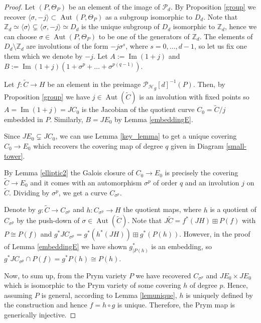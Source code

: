 \documentclass[10pt,a4paper]{amsart}
\DeclareMathOperator{\Aut}{Aut}
\DeclareMathOperator{\Image}{Im}
\newcommand{\ra}{\rightarrow}
\newcommand{\tC}{{\widetilde C}}
\begin{document}
\begin{proof}
	Let $(P,\Theta_P)$ be an element of the image of $\mathcal{P}_{d}$. By Proposition \ref{group} we recover $\langle \sigma, -j  \rangle \subset \Aut(P,\Theta_P)$ as a subgroup isomorphic to $D_{d}$. 
    Note that $\mathbb{Z}_{d} \simeq \langle \sigma \rangle \subsetneq \langle \sigma, -j \rangle \simeq D_{d}$ is the unique subgroup of $D_{d}$ isomorphic to $\mathbb{Z}_{d}$, hence we can choose $\sigma \in \Aut(P,\Theta_P)$ to be one of the generators of $\mathbb{Z}_{d}$. 
    The elements of $D_{d} \setminus \mathbb{Z}_{d}$ are involutions of the form $-j\sigma^s$, where $s = 0,\ldots, d-1$, so let us fix one them which we denote by $-j$. Let $A := \Image(1+j)$ and  $B := \Image(1+j)(1+\sigma^p+\ldots+\sigma^{p(q-1)})$. 
    
Let $f:\tC\to H$ be an element in the preimage $\mathcal{P_H}_g[d]^{-1}(P)$. Then, by Proposition \ref{group} we have $j\in \Aut(\tC)$ is an involution with fixed points so $A=\Image (1+j)=JC_0$ is the Jacobian of the quotient curve $C_0=\tC/j$ embedded in $P$. Similarly, $B=JE_0$ by Lemma \ref{embeddingE}.


   Since $JE_0 \subsetneq JC_0$, we can use Lemma \ref{key_lemma} to get a unique covering $C_0 \ra E_0$ which recovers the covering map of degree $q$ given in Diagram \eqref{small-tower}.

    By Lemma \ref{elliptic2} the Galois closure of $C_0 \to E_0$ is precisely the covering $\tC \to E_0$ and it comes  with an automorphism $\sigma^p$ of order $q$ and an involution $j$ on $\tC$. Dividing by $\sigma^p$, we get a curve $C_{\sigma^p}$. 
    
       Denote by $g:\tC\to C_{\sigma^p}$ and $h:C_{\sigma^p}\to H$ the quotient maps, where $h$ is a quotient of $C_{\sigma^p}$ by the push-down of $\sigma\in\Aut(\tC)$. Note that $J\tC=f^*(JH)\boxplus 
       P(f)$ with $P\cong P(f)$ and $g^*JC_{\sigma^p}=g^*(h^*(JH))\boxplus g^*(P(h))$. However, in the proof of Lemma \ref{embeddingE} we have shown $g^*_{|P(h)}$ is an embedding, so $g^*JC_{\sigma^p}\cap P(f)=g^*P(h)\cong P(h)$. 

    Now, to sum up, from the Prym variety $P$ we have recovered $C_{\sigma^p}$ and $JE_0\times JE_0$ which is isomorphic to the  Prym variety of some covering $h$ of degree $p$. Hence,  assuming $P$ is general, according to Lemma \ref{lemunique}, $h$ is uniquely defined by the construction and hence $f=h\circ g$ is unique.
    Therefore, the Prym map is generically injective. 
    \end{proof}
\end{document}
